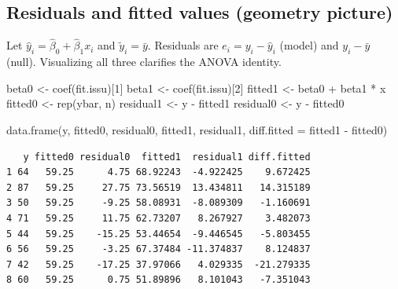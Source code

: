 \documentclass[
  letterpaper,
]{scrbook}
\newenvironment{Shaded}{\begin{snugshade}}{\end{snugshade}}
\newcommand{\AttributeTok}[1]{\textcolor[rgb]{0.40,0.45,0.13}{#1}}
\newcommand{\DecValTok}[1]{\textcolor[rgb]{0.68,0.00,0.00}{#1}}
\newcommand{\FunctionTok}[1]{\textcolor[rgb]{0.28,0.35,0.67}{#1}}
\newcommand{\NormalTok}[1]{\textcolor[rgb]{0.00,0.23,0.31}{#1}}
\newcommand{\OtherTok}[1]{\textcolor[rgb]{0.00,0.23,0.31}{#1}}
\newcommand{\SpecialCharTok}[1]{\textcolor[rgb]{0.37,0.37,0.37}{#1}}
\begin{document}
\subsection{Residuals and fitted values (geometry
picture)}\label{residuals-and-fitted-values-geometry-picture}

Let \(\hat y_i=\hat\beta_0+\hat\beta_1 x_i\) and \(\tilde y_i=\bar y\).
Residuals are \(e_i=y_i-\hat y_i\) (model) and \(y_i-\bar y\) (null).
Visualizing all three clarifies the ANOVA identity.

\begin{Shaded}
\begin{Highlighting}[]
\NormalTok{beta0 }\OtherTok{\textless{}{-}} \FunctionTok{coef}\NormalTok{(fit.issu)[}\DecValTok{1}\NormalTok{]}
\NormalTok{beta1 }\OtherTok{\textless{}{-}} \FunctionTok{coef}\NormalTok{(fit.issu)[}\DecValTok{2}\NormalTok{]}
\NormalTok{fitted1 }\OtherTok{\textless{}{-}}\NormalTok{ beta0 }\SpecialCharTok{+}\NormalTok{ beta1 }\SpecialCharTok{*}\NormalTok{ x}
\NormalTok{fitted0 }\OtherTok{\textless{}{-}} \FunctionTok{rep}\NormalTok{(ybar, n)}
\NormalTok{residual1 }\OtherTok{\textless{}{-}}\NormalTok{ y }\SpecialCharTok{{-}}\NormalTok{ fitted1}
\NormalTok{residual0 }\OtherTok{\textless{}{-}}\NormalTok{ y }\SpecialCharTok{{-}}\NormalTok{ fitted0}

\FunctionTok{data.frame}\NormalTok{(y, fitted0, residual0, fitted1, residual1,}
           \AttributeTok{diff.fitted =}\NormalTok{ fitted1 }\SpecialCharTok{{-}}\NormalTok{ fitted0)}
\end{Highlighting}
\end{Shaded}

\begin{verbatim}
   y fitted0 residual0  fitted1  residual1 diff.fitted
1 64   59.25      4.75 68.92243  -4.922425    9.672425
2 87   59.25     27.75 73.56519  13.434811   14.315189
3 50   59.25     -9.25 58.08931  -8.089309   -1.160691
4 71   59.25     11.75 62.73207   8.267927    3.482073
5 44   59.25    -15.25 53.44654  -9.446545   -5.803455
6 56   59.25     -3.25 67.37484 -11.374837    8.124837
7 42   59.25    -17.25 37.97066   4.029335  -21.279335
8 60   59.25      0.75 51.89896   8.101043   -7.351043
\end{verbatim}
\end{document}
